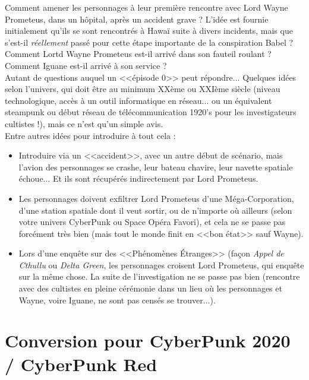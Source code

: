 \documentclass[11pt,twoside,a4paper]{book}
\begin{document}
Comment amener les personnages {\`a} leur premi{\`e}re rencontre avec Lord Wayne Prometeus, dans un h{\^o}pital, apr{\`e}s un accident grave ? L'id{\'e}e est fournie initialement qu'ils se sont rencontr{\'e}s {\`a} Hawa{\"i} suite {\`a} divers incidents, mais que s'est-il \emph{r{\'e}ellement} pass{\'e} pour cette {\'e}tape importante de la conspiration Babel ? Comment Lortd Wayne Prometeus est-il arriv{\'e} dans son fauteil roulant ? Comment Iguane est-il arriv{\'e} {\`a} son service ? ~\\

Autant de questions auquel un <<{\'e}pisode 0>> peut r{\'e}pondre... Quelques id{\'e}es selon l'univers, qui doit {\^e}tre au minimum XX{\`e}me ou XXI{\`e}me si{\`e}cle (niveau technologique, acc{\`e}s {\`a} un outil informatique en r{\'e}seau... ou un {\'e}quivalent steampunk ou d{\'e}but r{\'e}seau de t{\'e}l{\'e}communication 1920's pour les investigateurs cultistes !), mais ce n'est qu'un simple avis. ~\\

Entre autres id{\'e}es pour introduire {\`a} tout cela : 
\begin{itemize}
	\item Introduire via un <<accident>>, avec un autre d{\'e}but de sc{\'e}nario, mais l'avion des personnages se crashe, leur bateau chavire, leur navette spatiale {\'e}choue... Et ils sont r{\'e}cup{\'e}r{\'e}s indirectement par Lord Prometeus. 
	\item Les personnages doivent exfiltrer Lord Prometeus d'une M{\'e}ga-Corporation, d'une station spatiale dont il veut sortir, ou de n'importe o{\`u} ailleurs (selon votre univers CyberPunk ou Space Op{\'e}ra Favori), et cela ne se passe pas forc{\'e}ment tr{\`e}s bien (mais tout le monde finit en <<bon {\'e}tat>> sauf Wayne). 
	\item Lors d'une enqu{\^e}te sur des <<Ph{\'e}nom{\`e}nes {\'E}tranges>> (fa\c{c}on \emph{Appel de Cthullu} ou \emph{Delta Green}, les personnages croisent Lord Prometeus, qui enqu{\^e}te sur la m{\^e}me chose. La suite de l'investigation ne se passe pas bien (rencontre avec des cultistes en pleine c{\'e}r{\'e}monie dans un lieu o{\`u} les personnages et Wayne, voire Iguane, ne sont pas cens{\'e}s se trouver...). 
\end{itemize}

\section*{Conversion pour CyberPunk 2020 / CyberPunk Red}
\end{document}
